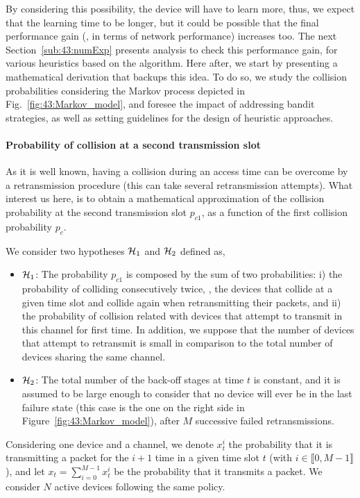 By considering this possibility, the device will have to learn more, thus, we expect that the learning time to be longer, but it could be possible that the final performance gain (\ie, in terms of network performance) increases too.
The next Section~\ref{sub:43:numExp} presents analysis to check this performance gain, for various heuristics based on the \UCB{} algorithm.
%
Here after, we start by presenting a mathematical derivation that backups this idea.
To do so, we study the collision probabilities considering the Markov process depicted in Fig.~\ref{fig:43:Markov_model}, and foresee the impact of addressing bandit strategies, as well as setting guidelines for the design of heuristic approaches.


\paragraph{Probability of collision at a second transmission slot}

As it is well known, having a collision during an access time can be overcome by a retransmission procedure (this can take several retransmission attempts).
What interest us here, is to obtain a mathematical approximation of the collision probability at the second transmission slot $p_{c1}$, as a function of the first collision probability $p_{c}$.

We consider two hypotheses $\mathcal{H}_{1}$ and $\mathcal{H}_{2}$ defined as,
\begin{itemize}
	\item $\mathcal{H}_{1}$:
    The probability $p_{c1}$ is composed by the sum of two probabilities: i)
    the probability of colliding consecutively twice, \ie, the devices that collide at a given time slot and collide again when retransmitting their packets,
    and ii) the probability of collision related with devices that attempt to transmit in this channel for first time.
    In addition, we suppose that the number of devices that attempt to retransmit is small in comparison to the total number of devices sharing the same channel.

	\item $\mathcal{H}_{2}$:
	The total number of the back-off stages at time $t$ is constant, and it is assumed to be large enough to consider that no device will ever be in the last failure state (this case is the one on the right side in Figure~\ref{fig:43:Markov_model}), after $M$ successive failed retransmissions.
\end{itemize}

Considering one device and a channel,
we denote $x_t^i$ the probability that it is transmitting a packet for the $i+1$ time in a given time slot $t$ (with $i\in \llbracket 0, M-1 \rrbracket$),
and let $x_t = \sum_{i=0}^{M-1}x_t^i$ be the probability that it transmits a packet.
We consider $N$ active devices following the same policy.

